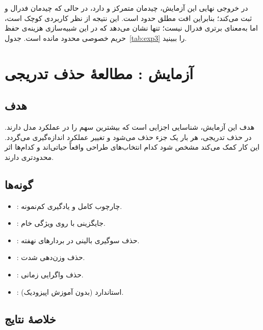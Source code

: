 در خروجی نهایی این آزمایش، چیدمان متمرکز   و   دارد، در حالی که چیدمان فدرال   و   ثبت می‌کند؛ بنابراین افت مطلق حدود   است. این نتیجه از نظر کاربردی کوچک است، اما به‌معنای برتری فدرال نیست؛ تنها نشان می‌دهد که در این شبیه‌سازی هزینه‌ی حفظ حریم خصوصی محدود مانده است. جدول~\ref{tab:exp3} را ببینید.

\section{آزمایش : مطالعۀ حذف تدریجی}

\subsection{هدف}

هدف این آزمایش، شناسایی اجزایی است که بیشترین سهم را در عملکرد مدل دارند. در حذف تدریجی، هر بار یک جزء حذف می‌شود و تغییر عملکرد اندازه‌گیری می‌گردد. این کار کمک می‌کند مشخص شود کدام انتخاب‌های طراحی واقعاً حیاتی‌اند و کدام‌ها اثر محدودتری دارند.

\subsection{گونه‌ها}

\begin{itemize}
\item \texttt{}: چارچوب کامل  و یادگیری کم‌نمونه.
\item \texttt{}: جایگزینی با  روی  ویژگی خام.
\item \texttt{}: حذف سوگیری بالینی در بردارهای نهفته.
\item \texttt{}: حذف وزن‌دهی شدت.
\item \texttt{}: حذف واگرایی زمانی.
\item \texttt{}:  استاندارد (بدون آموزش اپیزودیک).
\end{itemize}

\subsection{خلاصۀ نتایج}


